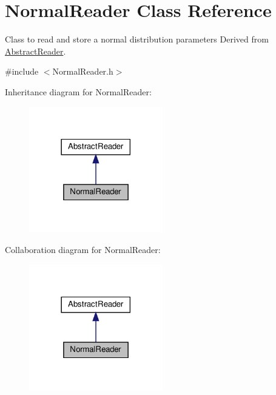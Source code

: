 \hypertarget{classNormalReader}{}\section{Normal\+Reader Class Reference}
\label{classNormalReader}


Class to read and store a normal distribution parameters Derived from \hyperlink{classAbstractReader}{Abstract\+Reader}.  




{\ttfamily \#include $<$Normal\+Reader.\+h$>$}



Inheritance diagram for Normal\+Reader\+:\nopagebreak
\begin{figure}[H]
\begin{center}
\leavevmode
\includegraphics[width=165pt]{classNormalReader__inherit__graph}
\end{center}
\end{figure}


Collaboration diagram for Normal\+Reader\+:\nopagebreak
\begin{figure}[H]
\begin{center}
\leavevmode
\includegraphics[width=165pt]{classNormalReader__coll__graph}
\end{center}
\end{figure}
